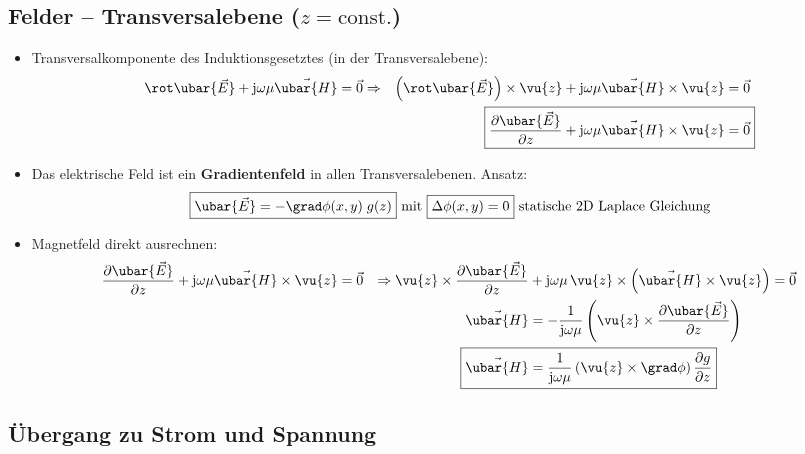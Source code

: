 \subsection{Felder -- Transversalebene (\(z=\text{const.}\))}
\begin{itemize}
	\item Transversalkomponente des Induktionsgesetztes (in der Transversalebene):
	\begin{align}
		\rot \ubar{\vec{E}} + \mathrm{j}\omega\mu\vec{\ubar{H}} & =\vec{0} \Rightarrow & \left(\rot \ubar{\vec{E}}\right)\times\vu{z} + \mathrm{j}\omega\mu\vec{\ubar{H}} \times\vu{z}       & =\vec{0}  \\
		&                      & \Aboxed{\frac{\partial \ubar{\vec{E}}}{\partial z} + \mathrm{j}\omega\mu\vec{\ubar{H}} \times\vu{z} & =\vec{0}}
	\end{align}
	\item Das elektrische Feld ist ein \textbf{Gradientenfeld} in allen Transversalebenen. Ansatz:
	\begin{equation}
		\boxed{\ubar{\vec{E}} = -\grad \phi(x,y) \; g(z)} \text{ mit } \boxed{\Delta \phi(x,y) = 0} \text{ statische 2D Laplace Gleichung}
	\end{equation}
	\item Magnetfeld direkt ausrechnen:
	\begin{align}
		\frac{\partial \ubar{\vec{E}}}{\partial z} + \mathrm{j}\omega\mu\vec{\ubar{H}} \times\vu{z} & =\vec{0} & \Rightarrow \vu{z}\times\frac{\partial \ubar{\vec{E}}}{\partial z} & + \mathrm{j}\omega\mu\, \vu{z}\times\left(\vec{\ubar{H}} \times\vu{z}\right) =\vec{0}                \\
		&          & \vec{\ubar{H}}                                                     & = -\frac{1}{\mathrm{j}\omega\mu} \left(\vu{z}\times\frac{\partial \ubar{\vec{E}}}{\partial z}\right) \\
		&          & \Aboxed{\vec{\ubar{H}}                                             & = \frac{1}{\mathrm{j}\omega\mu} \left(\vu{z}\times\grad \phi\right)\frac{\partial g}{\partial z}}
	\end{align}
\end{itemize}
\subsection{Übergang zu Strom und Spannung}
\begin{center}
	
\end{center}

